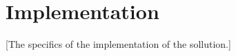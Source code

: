\section{Implementation}\label{implementation}
    [The specifics of the implementation of the sollution.]

